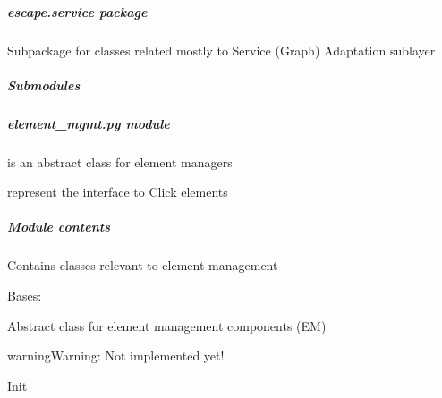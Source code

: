 \documentclass[letterpaper,10pt,english]{sphinxmanual}
\begin{document}
\subparagraph{\emph{escape.service} package}
\label{service/service:escape-service-package}\label{service/service::doc}\label{service/service:module-escape.service}
Subpackage for classes related mostly to Service (Graph) Adaptation sublayer


\subparagraph{Submodules}
\label{service/service:submodules}

\subparagraph{\emph{element\_mgmt.py} module}
\label{service/element_mgmt:element-mgmt-py-module}\label{service/element_mgmt::doc}
{\hyperref[service/element_mgmt:escape.service.element_mgmt.AbstractElementManager]{\emph{}}} is an abstract class for element managers

{\hyperref[service/element_mgmt:escape.service.element_mgmt.ClickManager]{\emph{}}} represent the interface to Click elements


\subparagraph{Module contents}
\label{service/element_mgmt:module-escape.service.element_mgmt}\label{service/element_mgmt:module-contents}
Contains classes relevant to element management

\begin{fulllineitems}
\label{service/element_mgmt:escape.service.element_mgmt.AbstractElementManager}
Bases: \href{https://docs.python.org/2.7/library/functions.html\#object}{}

Abstract class for element management components (EM)

\begin{notice}{warning}{Warning:}
Not implemented yet!
\end{notice}

\begin{fulllineitems}
\label{service/element_mgmt:escape.service.element_mgmt.AbstractElementManager.__init__}
Init

\end{fulllineitems}


\end{fulllineitems}

\end{document}
